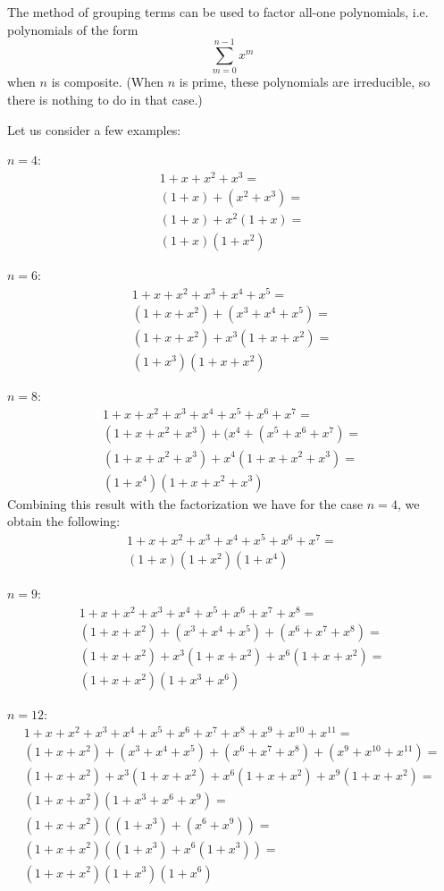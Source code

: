 \documentclass[12pt]{article}
\begin{document}
The method of grouping terms can be used to factor all-one polynomials, i.e. polynomials of the form
\[
\sum_{m=0}^{n-1} x^m
\]
when $n$ is composite. (When $n$ is prime, these polynomials are irreducible, so there is nothing to do in that case.)

Let us consider a few examples:

$n = 4$:
\begin{eqnarray*}
1 + x + x^2 + x^3 = \\
(1 + x) + (x^2 + x^3) = \\
(1 + x) + x^2 (1 + x) = \\
(1 + x) (1 + x^2)
\end{eqnarray*}

$n = 6$:
\begin{eqnarray*}
1 + x + x^2 + x^3 + x^4 + x^5 = \\
(1 + x + x^2) + (x^3 + x^4 + x^5) = \\
(1 + x + x^2) + x^3 (1 + x + x^2) = \\
(1 + x^3) (1 + x + x^2)
\end{eqnarray*}

$n = 8$:
\begin{eqnarray*}
1 + x + x^2 + x^3 + x^4 + x^5 + x^6 + x^7 = \\
(1 + x + x^2 + x^3) + (x^4 + (x^5 + x^6 + x^7) = \\
(1 + x + x^2 + x^3) + x^4 (1 + x + x^2 + x^3) =\\
(1 + x^4) (1 + x + x^2 + x^3)
\end{eqnarray*}
Combining this result with the factorization we have for the case $n=4$, we obtain the following:
\begin{eqnarray*}
1 + x + x^2 + x^3 + x^4 + x^5 + x^6 + x^7 = \\
(1 + x) (1 + x^2) (1 + x^4)
\end{eqnarray*}

$n = 9$:
\begin{eqnarray*}
1 + x + x^2 + x^3 + x^4 + x^5 + x^6 + x^7 + x^8 = \\
(1 + x + x^2) + (x^3 + x^4 + x^5) + (x^6 + x^7  + x^8) = \\
(1 + x + x^2) + x^3 (1 + x + x^2) + x^6 (1 + x + x^2) = \\
(1 + x + x^2) (1 + x^3 + x^6)
\end{eqnarray*}

$n = 12$:
\begin{eqnarray*}
1 + x + x^2 + x^3 + x^4 + x^5 + x^6 + x^7 + x^8 + x^9 + x^{10} + x^{11} = \\
(1 + x + x^2) + (x^3 + x^4 + x^5) + (x^6 + x^7 + x^8) + (x^9 + x^{10} + x^{11}) = \\
(1 + x + x^2) + x^3 (1 + x + x^2) + x^6 (1 + x + x^2) + x^9 (1 + x + x^2) = \\
(1 + x + x^2) (1 + x^3 + x^6 + x^9) = \\
(1 + x + x^2) ((1 + x^3) + (x^6 + x^9)) = \\
(1 + x + x^2) ((1 + x^3) + x^6 (1 + x^3)) = \\
(1 + x + x^2) (1 + x^3) (1 + x^6)
\end{eqnarray*}
\end{document}
